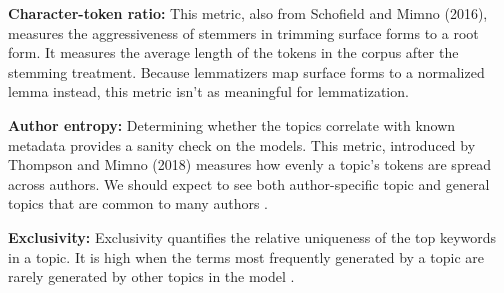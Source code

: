 \documentclass[11pt,a4paper]{article}
\begin{document}
\textbf{Character-token ratio:} This metric, also from Schofield and Mimno (2016), measures the aggressiveness of stemmers in trimming surface forms to a root form. It measures the average length of the tokens in the corpus after the stemming treatment. Because lemmatizers map surface forms to a normalized lemma instead, this metric isn't as meaningful for lemmatization.

\textbf{Author entropy:} Determining whether the topics correlate with known metadata provides a sanity check on the models. This metric, introduced by Thompson and Mimno (2018) measures how evenly a topic's tokens are spread across authors. We should expect to see both author-specific topic and general topics that are common to many authors \cite{Thompson2018AuthorlessTM}.

\textbf{Exclusivity:} Exclusivity quantifies the relative uniqueness of the top keywords in a topic. It is high when the terms most frequently generated by a topic are rarely generated by other topics in the model \cite{bischof2012exclusivity}.


\begin{table}[th!]
    \centering
    \caption{Token level corpus statistics for each lemmatization and stemming treatment. Differences in unpruned token counts are due to Pymystem3 and Stanza using their own tokenization and Snowball normalizing some single characters to empty strings.}
    \label{table:corpus}
\end{table}
\end{document}
